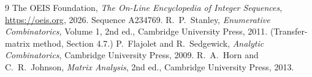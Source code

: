 \documentclass[11pt,a4paper]{article}
\theoremstyle{plain}
\theoremstyle{definition}
\begin{document}
\begin{thebibliography}{9}
 The OEIS Foundation, \emph{The On-Line Encyclopedia of Integer
Sequences}, \url{https://oeis.org}, 2026. Sequence A234769.
 R.~P.~Stanley, \emph{Enumerative Combinatorics}, Volume 1, 2nd ed.,
Cambridge University Press, 2011. (Transfer-matrix method, Section 4.7.)
 P.~Flajolet and R.~Sedgewick, \emph{Analytic Combinatorics}, Cambridge
University Press, 2009.
 R.~A.~Horn and C.~R.~Johnson, \emph{Matrix Analysis}, 2nd ed., Cambridge
University Press, 2013.
\end{thebibliography}
\end{document}
